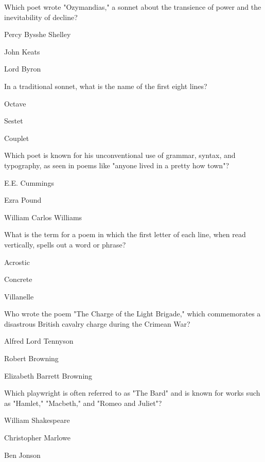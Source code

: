 \begin{enhancedmcq}{Which poet wrote "Ozymandias," a sonnet about the transience of power and the inevitability of decline?}
\item Percy Bysshe Shelley
\item John Keats
\item Lord Byron

\end{enhancedmcq}
\begin{enhancedmcq}{In a traditional sonnet, what is the name of the first eight lines?}
\item Octave
\item Sestet
\item Couplet

\end{enhancedmcq}
\begin{enhancedmcq}{Which poet is known for his unconventional use of grammar, syntax, and typography, as seen in poems like "anyone lived in a pretty how town"?}
\item E.E. Cummings
\item Ezra Pound
\item William Carlos Williams

\end{enhancedmcq}
\begin{enhancedmcq}{What is the term for a poem in which the first letter of each line, when read vertically, spells out a word or phrase?}
\item Acrostic
\item Concrete
\item Villanelle

\end{enhancedmcq}
\begin{enhancedmcq}{Who wrote the poem "The Charge of the Light Brigade," which commemorates a disastrous British cavalry charge during the Crimean War?}
\item Alfred Lord Tennyson
\item Robert Browning
\item Elizabeth Barrett Browning

\end{enhancedmcq}
\begin{enhancedmcq}{Which playwright is often referred to as "The Bard" and is known for works such as "Hamlet," "Macbeth," and "Romeo and Juliet"?}
\item William Shakespeare
\item Christopher Marlowe
\item Ben Jonson

\end{enhancedmcq}
